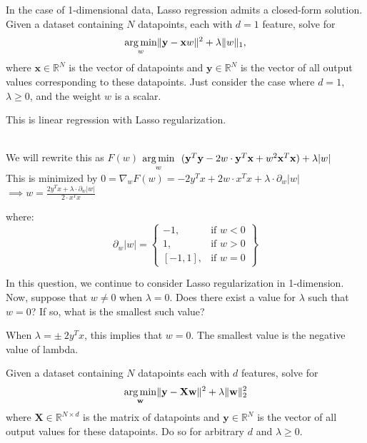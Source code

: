 \problem[7]

\subproblem
In the case of 1-dimensional data, Lasso regression admits a closed-form solution.
Given a dataset containing $N$ datapoints, each with $d = 1$ feature, solve for
\[\underset{w}{\operatorname{arg\,min}} \Vert\mathbf{y} - \mathbf{x}w\Vert^2 + \lambda\Vert w\Vert_1,
\]
where $\mathbf{x} \in \mathbb{R}^{N}$ is the vector of datapoints and $\mathbf{y} \in \mathbb{R}^N$ is the  vector of all output values corresponding to these datapoints. Just consider the case where $d = 1$, $\lambda \geq 0$, and the weight $w$ is a scalar.

This is linear regression with Lasso regularization.

\begin{subsolution}
  \\
  We will rewrite this as $F(w)$ $\underset{w}{\operatorname{arg\,min}} 
  \ \ (\mathbf{y}^T\mathbf{y} - 2w\cdot\mathbf{y}^T\mathbf{x} + w^2\mathbf{x}^T\mathbf{x}) + \lambda\vert{w}\vert$ \\

  This is minimized by $0 = \nabla_{w}F(w) = -2y^Tx + 2w\cdot x^Tx + \lambda\cdot\partial_{w}\vert{w}\vert$ \\ 
  $\implies w = \frac{2y^Tx + \lambda\cdot\partial_{w}\vert{w}\vert}{2\cdot{x^T}{x}}$

  where: 
  \begin{equation}
    \partial_{w}\vert{w}\vert = 
    \left\{
        \begin{array}{lr}
            -1, & \text{if } w < 0 \\
            1, & \text{if } w > 0 \\
            \left[-1, 1\right], & \text{if } w = 0
        \end{array}
    \right\}
  \end{equation}

\end{subsolution}

\subproblem
In this question, we continue to consider Lasso regularization in 1-dimension. Now, suppose that $w \neq 0$ when $\lambda = 0$. Does there exist a value for $\lambda$ such that $w = 0$? If so, what is the smallest such value?

\begin{subsolution}
  When $\lambda = \pm \ 2y^Tx$, this implies that $w = 0$. The smallest value is the negative value of lambda.
\end{subsolution}

\problem[7]
\subproblem
Given a dataset containing $N$ datapoints each with $d$ features, solve for
\[\underset{\mathbf{w}}{\operatorname{arg\,min}} \Vert\mathbf{y} - \mathbf{X}\mathbf{w}\Vert^2 + \lambda\Vert\mathbf{w}\Vert_2^2
\]
where $\mathbf{X} \in \mathbb{R}^{N \times d}$ is the matrix of datapoints and $\mathbf{y} \in \mathbb{R}^N$ is the  vector of all output values for these datapoints. Do so for arbitrary $d$ and $\lambda \geq 0$.

